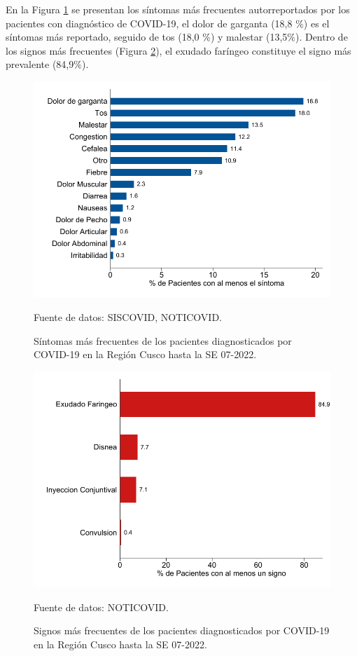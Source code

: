 \documentclass[12pt,a4paper,openany]{book}
\begin{document}
\noindent En la Figura \ref{fig:sintomas} se presentan los síntomas más frecuentes autorreportados por los pacientes con diagnóstico de COVID-19, el dolor de garganta (18,8 $\%$) es el síntomas más reportado, seguido de tos (18,0 $\%$) y malestar (13,5$\%$). Dentro de los signos más frecuentes (Figura \ref{fig:signos}), el exudado faríngeo constituye el signo más prevalente (84,9$\%$). 

\begin{figure}[h]
	\caption{Síntomas más frecuentes de los pacientes diagnosticados por COVID-19 en la Región Cusco hasta la SE 07-2022.  }\label{fig:sintomas}
	\begin{center}
		\includegraphics[width=0.85\linewidth]{../figuras/figura_sintoma.pdf}
	\end{center}
	{\footnotesize {Fuente de datos: SISCOVID, NOTICOVID.}}
\end{figure}

\begin{figure}[h]
	\caption{Signos más frecuentes de los pacientes diagnosticados por COVID-19 en la Región Cusco hasta la SE 07-2022.}\label{fig:signos}
	\begin{center}
		\includegraphics[width=0.65\linewidth]{../figuras/figura_signo.pdf}
	\end{center}
	{\footnotesize {Fuente de datos: NOTICOVID.}}
\end{figure}
\end{document}
